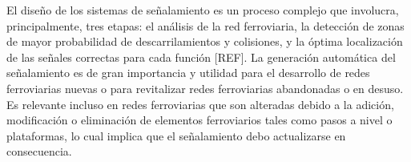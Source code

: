     El diseño de los sistemas de señalamiento es un proceso complejo que involucra, principalmente, tres etapas: el análisis de la red ferroviaria, la detección de zonas de mayor probabilidad de descarrilamientos y colisiones, y la óptima localización de las señales correctas para cada función [REF]. La generación automática del señalamiento es de gran importancia y utilidad para el desarrollo de redes ferroviarias nuevas o para revitalizar redes ferroviarias abandonadas o en desuso. Es relevante incluso en redes ferroviarias que son alteradas debido a la adición, modificación o eliminación de elementos ferroviarios tales como pasos a nivel o plataformas, lo cual implica que el señalamiento debo actualizarse en consecuencia.




